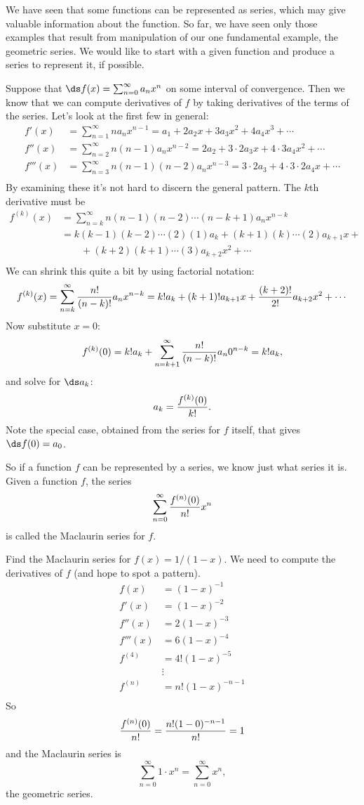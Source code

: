 \nobreak
We have seen that some functions can be represented as series, which
may give valuable information about the function. So far, we have seen
only those examples that result from manipulation of our one
fundamental example, the geometric series. We would like to start with
a given function and produce a series to represent it, if possible.

Suppose that $\ds f(x)=\sum_{n=0}^\infty a_nx^n$ on some interval of
convergence. Then we know that we can compute derivatives of $f$ by
taking derivatives of the terms of the series. Let's look at the first
few in general:
\begin{align*}
  f'(x)&=\sum_{n=1}^\infty n a_n x^{n-1}=a_1 + 2a_2x+3a_3x^2+4a_4x^3+\cdots \\
  f''(x)&=\sum_{n=2}^\infty n(n-1) a_n x^{n-2}=2a_2+3\cdot2a_3x
    +4\cdot3a_4x^2+\cdots \\
  f'''(x)&=\sum_{n=3}^\infty n(n-1)(n-2) a_n x^{n-3}=3\cdot2a_3
    +4\cdot3\cdot2a_4x+\cdots \\
\end{align*}
By examining these it's not hard to discern the general pattern. The
$k$th derivative must be
\begin{align*}
  f^{(k)}(x)&=\sum_{n=k}^\infty n(n-1)(n-2)\cdots(n-k+1)a_nx^{n-k} \\
  &=k(k-1)(k-2)\cdots(2)(1)a_k+(k+1)(k)\cdots(2)a_{k+1}x+{} \\
  &\qquad {}+(k+2)(k+1)\cdots(3)a_{k+2}x^2+\cdots \\
\end{align*}
We can shrink this quite a bit by using factorial notation:
$$
  f^{(k)}(x)=\sum_{n=k}^\infty {n!\over (n-k)!}a_nx^{n-k}=
  k!a_k+(k+1)!a_{k+1}x+{(k+2)!\over 2!}a_{k+2}x^2+\cdots
$$
Now substitute $x=0$:
$$f^{(k)}(0)=k!a_k+\sum_{n=k+1}^\infty {n!\over (n-k)!}a_n0^{n-k}=k!a_k,$$
and solve for $\ds a_k$:
$$a_k={f^{(k)}(0)\over k!}.$$
Note the special case, obtained from the series for $f$ itself, that
gives $\ds f(0)=a_0$.

So if a function $f$ can be represented by a series, we know just what
series it is. Given a function $f$, the series
$$\sum_{n=0}^\infty {f^{(n)}(0)\over n!}x^n$$
is called the {\dfont Maclaurin 
series\/} for $f$.

\begin{example} Find the Maclaurin series for $f(x)=1/(1-x)$. We need to
compute the derivatives of $f$ (and hope to spot a pattern).
\begin{align*}
  f(x)&=(1-x)^{-1} \\
  f'(x)&=(1-x)^{-2} \\
  f''(x)&=2(1-x)^{-3} \\
  f'''(x)&=6(1-x)^{-4} \\
  f^{(4)}&=4!(1-x)^{-5} \\
  &\vdots \\
  f^{(n)}&=n!(1-x)^{-n-1} \\
\end{align*}
So
$${f^{(n)}(0)\over n!}={n!(1-0)^{-n-1}\over n!}=1$$
and the Maclaurin series is
$$\sum_{n=0}^\infty 1\cdot x^n=\sum_{n=0}^\infty x^n,$$
the geometric series.
\end{example}

